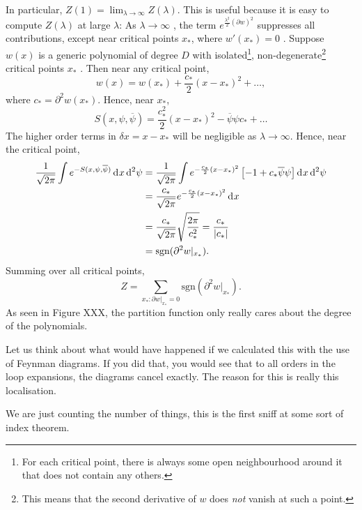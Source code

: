 In particular, $ Z(1) = \lim_{\lambda \to \infty}  Z(\lambda) $. This is useful because it is easy to compute $Z(\lambda)$  at large $\lambda$: As $\lambda \to \infty$ , the term $e^{\frac{\lambda^2}{2} (\partial w)^2}$  suppresses all contributions, except near critical points $x_*$, where  $w'(x_*) = 0$ .
Suppose $w(x)$  is a generic polynomial of degree $D$ with isolated\footnote{For each critical point, there is always some open neighbourhood around it that does not contain any others.}, non-degenerate\footnote{This means that the second derivative of $w$ does \emph{not} vanish at such a point.} critical points  $x_*$ .
Then near any critical point, 
\begin{equation}
  w(x) = w(x_*) + \frac{c_*}{2} (x-x_*)^2 + \dots,
\end{equation} 
where $c_* = \partial^2 w(x_*)$.
Hence, near $x_*$,
\begin{equation}
  S(x, \psi, \overline{\psi}) = \frac{c_*^2}{2} (x - x_*)^2 - \overline{\psi}\psi c_* + \dots
\end{equation}
The higher order terms in $\delta x = x - x_*$ will be negligible as $\lambda \to \infty$.
Hence, near the critical point,
\begin{align}
  \frac{1}{\sqrt{2\pi}} \int e^{-S(x, \psi, \overline{\psi})} \dd[]{x} \dd[2]{\psi} &= \frac{1}{\sqrt{2\pi}} \int e^{-\frac{c_*}{2} (x  -x_*)^2} \left[ -1 + c_* \overline{\psi} \psi \right] \dd[]{x} \dd[2]{\psi} \\
										    &= \frac{c_*}{\sqrt{ 2 \pi}} e^{-\frac{c_*}{2} (x - x_*)^2} \dd[]{x} \\
										    &= \frac{c_*}{\sqrt{ 2 \pi}} \sqrt{\frac{2 \pi}{c_*^2}} = \frac{c_*}{\abs{c_*}} \\
										    &= \text{sgn}(\partial^2 w \rvert_{x_*}).
\end{align}
Summing over all critical points, 
\begin{equation}
  Z = \sum_{x_*: \partial w\rvert_{x_*} = 0} \text{sgn}(\partial^2 w\rvert_{x_*}).
\end{equation}
As seen in Figure XXX, the partition function only really cares about the degree of the polynomials.

Let us think about what would have happened if we calculated this with the use of Feynman diagrams.
If you did that, you would see that to all orders in the loop expansions, the diagrams cancel exactly.
The reason for this is really this localisation.

We are just counting the number of things, this is the first sniff at some sort of index theorem.
